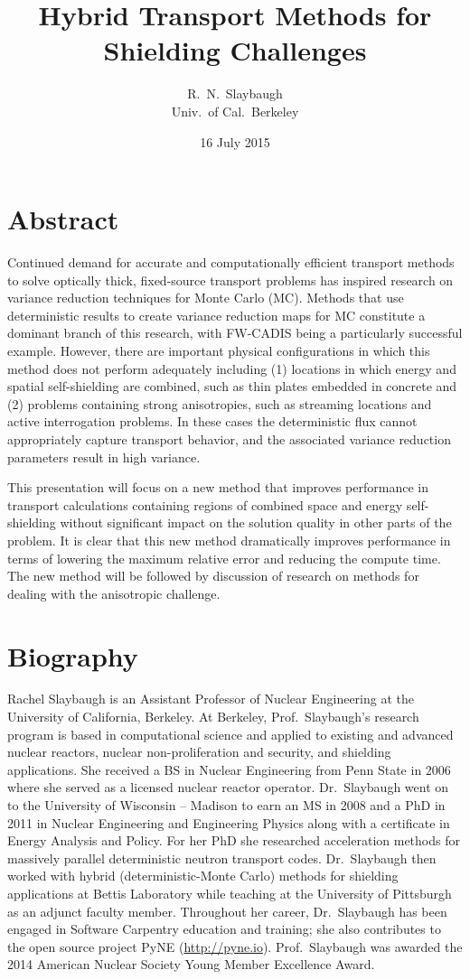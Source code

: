 \documentclass[12pt]{article}
\title{Hybrid Transport Methods for Shielding Challenges}
\author{R.\ N.\ Slaybaugh \\ Univ.\ of Cal.\ Berkeley}
\date{16 July 2015}
\begin{document}
\maketitle

\section*{Abstract}

Continued demand for accurate and computationally efficient transport methods to solve optically thick, fixed-source transport problems has inspired research on variance reduction techniques for Monte Carlo (MC). Methods that use deterministic results to create variance reduction maps for MC constitute a dominant branch of this research, with FW-CADIS being a particularly successful example. However, there are important physical configurations in which this method does not perform adequately including (1) locations in which energy and spatial self-shielding are combined, such as thin plates embedded in concrete and (2) problems containing strong anisotropies, such as streaming locations and active interrogation problems. In these cases the deterministic flux cannot appropriately capture transport behavior, and the associated variance reduction parameters result in high variance. 

This presentation will focus on a new method that improves performance in transport calculations containing regions of combined space and energy self-shielding without significant impact on the solution quality in other parts of the problem. It is clear that this new method dramatically improves performance in terms of lowering the maximum relative error and reducing the compute time. The new method will be followed by discussion of research on methods for dealing with the anisotropic challenge.

\section*{Biography}
Rachel Slaybaugh is an Assistant Professor of Nuclear Engineering at the University of California, Berkeley. At Berkeley, Prof.\ Slaybaugh's research program is based in computational science and applied to existing and advanced nuclear reactors, nuclear non-proliferation and security, and shielding applications. She received a BS in Nuclear Engineering from Penn State in 2006 where she served as a licensed nuclear reactor operator. Dr.\ Slaybaugh went on to the University of Wisconsin -- Madison to earn an MS in 2008 and a PhD in 2011 in Nuclear Engineering and Engineering Physics along with a certificate in Energy Analysis and Policy. For her PhD she researched acceleration methods for massively parallel deterministic neutron transport codes. Dr.\ Slaybaugh then worked with hybrid (deterministic-Monte Carlo) methods for shielding applications at Bettis Laboratory while teaching at the University of Pittsburgh as an adjunct faculty member. Throughout her career, Dr.\ Slaybaugh has been engaged in Software Carpentry education and training; she also contributes to the open source project PyNE (\href{http://pyne.io}{http://pyne.io}). Prof.\ Slaybaugh was awarded the 2014 American Nuclear Society Young Member Excellence Award.
\end{document}
